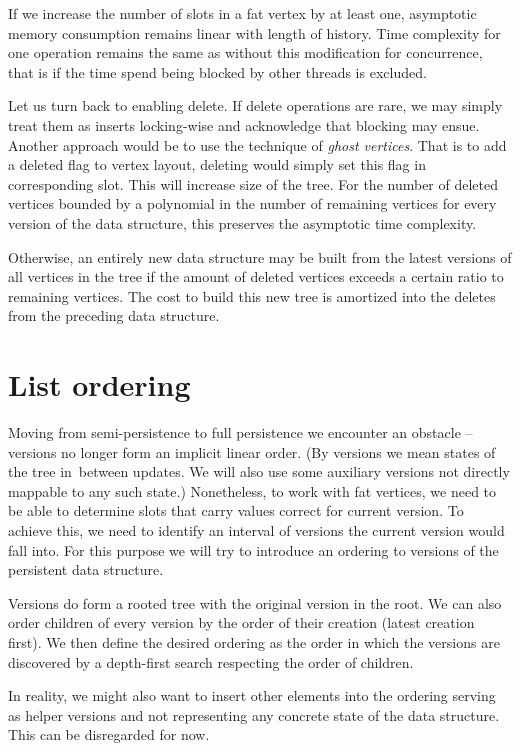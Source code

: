 If we increase the number of slots in a fat vertex by at least one, asymptotic memory consumption remains linear with length of history. Time complexity for one operation remains the same as without this modification for concurrence, that is if the time spend being blocked by other threads is excluded.

Let us turn back to enabling delete. If delete operations are rare, we may simply treat them as inserts locking-wise and acknowledge that blocking may ensue. Another approach would be to use the technique of \textit{ghost vertices}. That is to add a deleted flag to vertex layout, deleting would simply set this flag in corresponding slot. This will increase size of the tree. For the number of deleted vertices bounded by a polynomial in the number of remaining vertices for every version of the data structure, this preserves the asymptotic time complexity. 

Otherwise, an entirely new data structure may be built from the latest versions of all vertices in the tree if the amount of deleted vertices exceeds a certain ratio to remaining vertices. The cost to build this new tree is amortized into the deletes from the preceding data structure.



\section{List ordering}

Moving from semi-persistence to full persistence we encounter an obstacle -- versions no longer form an implicit linear order. (By versions we mean states of the tree in~between updates. We will also use some auxiliary versions not directly mappable to any such state.) Nonetheless, to work with fat vertices, we need to be able to determine slots that carry values correct for current version. To achieve this, we need to identify an interval of versions the current version would fall into. For this purpose we will try to introduce an ordering to versions of the persistent data structure.

Versions do form a rooted tree with the original version in the root. We can also order children of every version by the order of their creation (latest creation first). We then define the desired ordering as the order in which the versions are discovered by a depth-first search respecting the order of children. %

In reality, we might also want to insert other elements into the ordering serving as helper versions and not representing any concrete state of the data structure. This can be disregarded for now.

